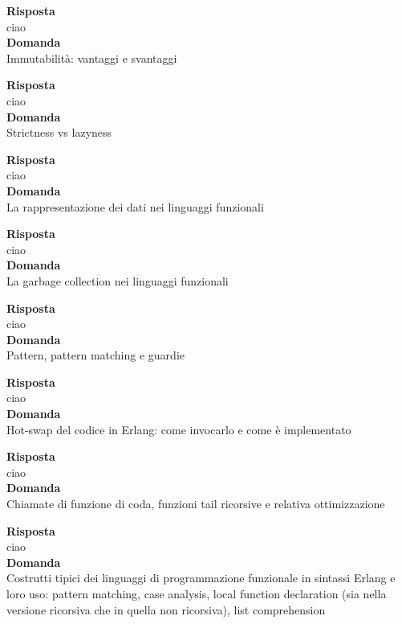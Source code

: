 \documentclass{article}
\begin{document}
\textbf{Risposta}\\
ciao
\vspace{14pt}\\
\textbf{Domanda}\\
Immutabilità: vantaggi e svantaggi

\textbf{Risposta}\\
ciao
\vspace{14pt}\\
\textbf{Domanda}\\
Strictness vs lazyness

\textbf{Risposta}\\
ciao
\vspace{14pt}\\
\textbf{Domanda}\\
La rappresentazione dei dati nei linguaggi funzionali

\textbf{Risposta}\\
ciao
\vspace{14pt}\\
\textbf{Domanda}\\
La garbage collection nei linguaggi funzionali

\textbf{Risposta}\\
ciao
\vspace{14pt}\\
\textbf{Domanda}\\
Pattern, pattern matching e guardie

\textbf{Risposta}\\
ciao
\vspace{14pt}\\
\textbf{Domanda}\\
Hot-swap del codice in Erlang: come invocarlo e come è implementato

\textbf{Risposta}\\
ciao
\vspace{14pt}\\
\textbf{Domanda}\\
Chiamate di funzione di coda, funzioni tail ricorsive e relativa ottimizzazione

\textbf{Risposta}\\
ciao
\vspace{14pt}\\
\textbf{Domanda}\\
Costrutti tipici dei linguaggi di programmazione funzionale in sintassi Erlang e loro uso: pattern matching, case analysis, local function declaration (sia nella versione ricorsiva che in quella non ricorsiva), list comprehension
\end{document}
